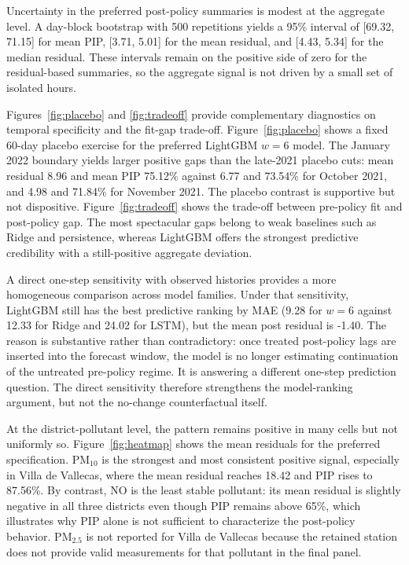 Uncertainty in the preferred post-policy summaries is modest at the aggregate level. A day-block bootstrap with 500 repetitions yields a 95\% interval of [69.32, 71.15] for mean PIP, [3.71, 5.01] for the mean residual, and [4.43, 5.34] for the median residual. These intervals remain on the positive side of zero for the residual-based summaries, so the aggregate signal is not driven by a small set of isolated hours.

Figures~\ref{fig:placebo} and \ref{fig:tradeoff} provide complementary diagnostics on temporal specificity and the fit-gap trade-off. Figure~\ref{fig:placebo} shows a fixed 60-day placebo exercise for the preferred LightGBM $w=6$ model. The January 2022 boundary yields larger positive gaps than the late-2021 placebo cuts: mean residual 8.96 and mean PIP 75.12\% against 6.77 and 73.54\% for October 2021, and 4.98 and 71.84\% for November 2021. The placebo contrast is supportive but not dispositive. Figure~\ref{fig:tradeoff} shows the trade-off between pre-policy fit and post-policy gap. The most spectacular gaps belong to weak baselines such as Ridge and persistence, whereas LightGBM offers the strongest predictive credibility with a still-positive aggregate deviation.

A direct one-step sensitivity with observed histories provides a more homogeneous comparison across model families. Under that sensitivity, LightGBM still has the best predictive ranking by MAE (9.28 for $w=6$ against 12.33 for Ridge and 24.02 for LSTM), but the mean post residual is -1.40. The reason is substantive rather than contradictory: once treated post-policy lags are inserted into the forecast window, the model is no longer estimating continuation of the untreated pre-policy regime. It is answering a different one-step prediction question. The direct sensitivity therefore strengthens the model-ranking argument, but not the no-change counterfactual itself.

At the district-pollutant level, the pattern remains positive in many cells but not uniformly so. Figure~\ref{fig:heatmap} shows the mean residuals for the preferred specification. PM$_{10}$ is the strongest and most consistent positive signal, especially in Villa de Vallecas, where the mean residual reaches 18.42 and PIP rises to 87.56\%. By contrast, NO is the least stable pollutant: its mean residual is slightly negative in all three districts even though PIP remains above 65\%, which illustrates why PIP alone is not sufficient to characterize the post-policy behavior. PM$_{2.5}$ is not reported for Villa de Vallecas because the retained station does not provide valid measurements for that pollutant in the final panel.

